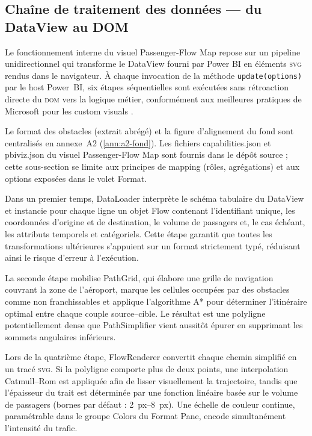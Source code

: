\subsection{Chaîne de traitement des données — du DataView au DOM}
\label{subsec:4A-pipeline}

\setlength{\parindent}{0pt}

Le fonctionnement interne du visuel Passenger\nobreakdash-Flow Map repose sur un pipeline unidirectionnel qui transforme le DataView fourni par Power BI en éléments \textsc{svg} rendus dans le navigateur. À chaque invocation de la méthode \verb|update(options)| par le host Power~BI, six étapes séquentielles sont exécutées sans rétroaction directe du \textsc{dom} vers la logique métier, conformément aux meilleures pratiques de Microsoft pour les custom visuals \parencite{microsoft2024}.

Le format des obstacles (extrait abrégé) et la figure d’alignement du fond sont centralisés en annexe~A2 (\autoref{ann:a2-fond}). Les fichiers capabilities.json et pbiviz.json du visuel Passenger-Flow Map sont fournis dans le dépôt source ; cette sous-section se limite aux principes de mapping (rôles, agrégations) et aux options exposées dans le volet Format.

Dans un premier temps, DataLoader interprète le schéma tabulaire du DataView et instancie pour chaque ligne un objet Flow contenant l’identifiant unique, les coordonnées d’origine et de destination, le volume de passagers et, le cas échéant, les attributs temporels et catégoriels. Cette étape garantit que toutes les transformations ultérieures s’appuient sur un format strictement typé, réduisant ainsi le risque d’erreur à l’exécution.

La seconde étape mobilise PathGrid, qui élabore une grille de navigation couvrant la zone de l’aéroport, marque les cellules occupées par des obstacles comme non franchissables et applique l’algorithme A* pour déterminer l’itinéraire optimal entre chaque couple \mbox{source–cible}. Le résultat est une polyligne potentiellement dense que PathSimplifier vient aussitôt épurer en supprimant les sommets angulaires inférieurs.

Lors de la quatrième étape, FlowRenderer convertit chaque chemin simplifié en un tracé \textsc{svg}. Si la polyligne comporte plus de deux points, une interpolation Catmull–Rom est appliquée afin de lisser visuellement la trajectoire, tandis que l’épaisseur du trait est déterminée par une fonction linéaire basée sur le volume de passagers (bornes par défaut : 2~px–8~px). Une échelle de couleur continue, paramétrable dans le groupe Colors du Format Pane, encode simultanément l’intensité du trafic.

